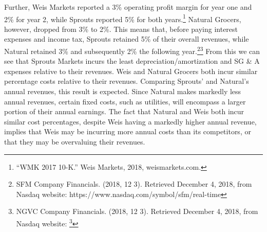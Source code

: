 \documentclass[12pt]{article}
\begin{document}
\begin{doublespacing}
Further, Weis Markets reported a 3\% operating profit margin for year one and 2\% for year 2, while Sprouts reported 5\% for both years.\footnote{“WMK 2017 10-K.” Weis Markets, 2018, weismarkets.com.} Natural Grocers, however, dropped from 3\% to 2\%. This means that, before paying interest expenses and income tax, Sprouts retained 5\% of their overall revenues, while Natural retained 3\% and subsequently 2\% the following year.\footnote{SFM Company Financials. (2018, 12 3). Retrieved December 4, 2018, from Nasdaq website: 
     https://www.nasdaq.com/symbol/sfm/real-time }\footnote{NGVC Company Financials. (2018, 12 3). Retrieved December 4, 2018, from Nasdaq website: 
     \footnote{SFM Company Financials. (2018, 12 3). Retrieved December 4, 2018, from Nasdaq 
     website: https://www.nasdaq.com/symbol/sfm/real-time } } From this we can see that Sprouts Markets incurs the least depreciation/amortization and SG & A expenses relative to their revenues. Weis and Natural Grocers both incur similar percentage costs relative to their revenues. Comparing Sprouts' and Natural's annual revenues, this result is expected. Since Natural makes markedly less annual revenues, certain fixed costs, such as utilities, will encompass a larger portion of their annual earnings. The fact that Natural and Weis both incur similar cost percentages, despite Weis having a markedly higher annual revenue, implies that Weis may be incurring more annual costs than its competitors, or that they may be overvaluing their revenues. 


\end{doublespacing}
\end{document}
